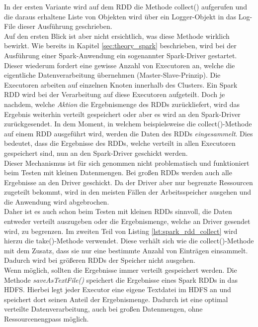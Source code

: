 \noindent
In der ersten Variante wird auf dem RDD die Methode collect() aufgerufen und die daraus erhaltene Liste von Objekten wird über ein Logger-Objekt in das Log-File dieser Ausführung geschrieben.\\
Auf den ersten Blick ist aber nicht ersichtlich, was diese Methode wirklich bewirkt. Wie bereits in Kapitel \ref{sec:theory_spark} beschrieben, wird bei der Ausführung einer Spark-Anwendung ein sogenannter Spark-Driver gestartet. Dieser wiederum fordert eine gewisse Anzahl von Executoren an, welche die eigentliche Datenverarbeitung übernehmen (Master-Slave-Prinzip). Die Executoren arbeiten auf einzelnen Knoten innerhalb des Clusters. 
Ein Spark RDD wird bei der Verarbeitung auf diese Executoren aufgeteilt. Doch je nachdem, welche \textit{Aktion} die Ergebnismenge des RDDs zurückliefert, wird das Ergebnis weiterhin verteilt gespeichert oder aber es wird an den Spark-Driver zurückgesendet. In dem Moment, in welchem beispielsweise die collect()-Methode auf einem RDD ausgeführt wird, werden die Daten des RDDs \textit{eingesammelt}. 
Dies bedeutet, dass die Ergebnisse des RDDs, welche verteilt in allen Executoren gespeichert sind, nun an den Spark-Driver geschickt werden.\\
Dieser Mechanismus ist für sich genommen nicht problematisch und funktioniert beim Testen mit kleinen Datenmengen. Bei großen RDDs werden auch alle Ergebnisse an den Driver geschickt. Da der Driver aber nur begrenzte Ressourcen zugeteilt bekommt, wird in den meisten Fällen der Arbeitsspeicher ausgehen und die Anwendung wird abgebrochen.\\
Daher ist es auch schon beim Testen mit kleinen RDDs sinnvoll, die Daten entweder verteilt auszugeben oder die Ergebnismenge, welche an Driver gesendet wird, zu begrenzen. Im zweiten Teil von Listing \ref{lst:spark_rdd_collect}  wird hierzu die take()-Methode verwendet. Diese verhält sich wie  die collect()-Methode mit dem Zusatz, dass sie nur eine bestimmte Anzahl von Einträgen einsammelt. Dadurch wird bei größeren RDDs der Speicher nicht ausgehen.\\
Wenn möglich, sollten die Ergebnisse immer verteilt gespeichert werden. Die Methode \textit{saveAsTextFile()} speichert die Ergebnisse eines Spark RDDs in das HDFS. Hierbei legt jeder Executor eine eigene Textdatei im HDFS an und speichert dort seinen Anteil der Ergebnismenge. Dadurch ist eine optimal verteilte Datenverarbeitung, auch bei großen Datenmengen, ohne Ressourcenengpass möglich. 


